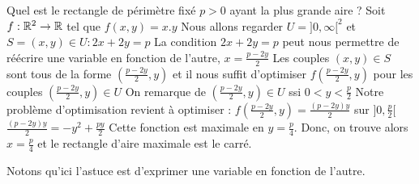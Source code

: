 \begin{exemple}
    Quel est le rectangle de périmètre fixé $p > 0$ ayant la plus grande aire ?
    Soit $f : \mathbb{R}^2 \to \mathbb{R}$ tel que $f(x,y) = x.y$
    Nous allons regarder $U = ]0,\infty[^2$
    et $S = {(x,y)\in U : 2x + 2y = p}$
    La condition $ 2x + 2y = p$ peut nous permettre de réécrire une variable en fonction de l'autre, $x = \frac{p-2y}{2}$ 
    Les couples $(x,y) \in S$ sont tous de la forme $(\frac{p-2y}{2},y)$ et il nous suffit d'optimiser $f(\frac{p-2y}{2},y)$ pour les couples $(\frac{p-2y}{2},y) \in U$
    On remarque de $(\frac{p-2y}{2},y) \in U$ ssi $0 < y <\frac{p}{2}$
    Notre problème d'optimisation revient à optimiser :
    $f(\frac{p-2y}{2},y) = \frac{(p-2y)y}{2}$ sur $]0,\frac{p}{2}[$
    $\frac{(p-2y)y}{2} = -y^2 + \frac{py}{2}$
    Cette fonction est maximale en $y = \frac{p}{4}$.
    Donc, on trouve alors $x = \frac{p}{4}$ et le rectangle d'aire maximale est le carré.
    \end{exemple}
Notons qu'ici l'astuce est d'exprimer une variable en fonction de l'autre.

